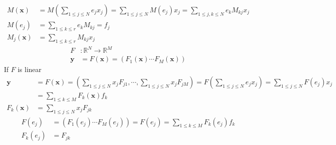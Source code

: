 \documentclass[aps,preprint]{revtex4}%
\begin{document}
\begin{align}
M\left(  \mathbf{x}\right)    & =M\left(
{\textstyle\sum\limits_{1\leq j\leq N}}
e_{j}x_{j}\right)  =%
{\textstyle\sum\limits_{1\leq j\leq N}}
M\left(  e_{j}\right)  x_{j}=%
{\textstyle\sum\limits_{1\leq j,k\leq N}}
e_{k}M_{kj}x_{j}\\
M\left(  e_{j}\right)    & =%
{\textstyle\sum\limits_{1\leq k\leq r}}
e_{k}M_{kj}=f_{j}\\
M_{j}\left(  \mathbf{x}\right)    & =%
{\textstyle\sum\limits_{1\leq k\leq r}}
M_{kj}x_{j}%
\end{align}%
\begin{align}
F  & :\mathbb{R}^{N}\rightarrow\mathbb{R}^{M}\\
\mathbf{y}  & \mathbf{=}F\left(  \mathbf{x}\right)  =\left(  F_{1}\left(
\mathbf{x}\right)  \cdots F_{M}\left(  \mathbf{x}\right)  \right)
\end{align}
If $F$ is linear
\begin{align}
\mathbf{y}  & =F\left(  \mathbf{x}\right)  =\left(  \sum_{1\leq j\leq N}%
x_{j}F_{j1},\cdots,\sum_{1\leq j\leq N}x_{j}F_{jM}\right)  =F\left(
{\textstyle\sum\limits_{1\leq j\leq N}}
e_{j}x_{j}\right)  =%
{\textstyle\sum\limits_{1\leq j\leq N}}
F\left(  e_{j}\right)  x_{j}\\
& =\sum_{1\leq k\leq M}F_{k}\left(  \mathbf{x}\right)  f_{k}\\
F_{k}\left(  \mathbf{x}\right)    & =\sum_{1\leq j\leq N}x_{j}F_{jk}%
\end{align}%
\begin{align}
F\left(  e_{j}\right)    & =\left(  F_{1}\left(  e_{j}\right)  \cdots
F_{M}\left(  e_{j}\right)  \right)  =F\left(  e_{j}\right)  =\sum_{1\leq k\leq
M}F_{k}\left(  e_{j}\right)  f_{k}\\
F_{k}\left(  e_{j}\right)    & =F_{jk}%
\end{align}
\end{document}
